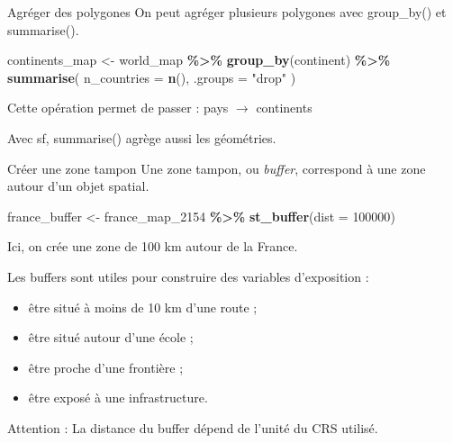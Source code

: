 \documentclass[
  10pt,
  ignorenonframetext,
]{beamer}
\newenvironment{Shaded}{\begin{snugshade}}{\end{snugshade}}
\newcommand{\AttributeTok}[1]{\textcolor[rgb]{0.13,0.29,0.53}{#1}}
\newcommand{\DecValTok}[1]{\textcolor[rgb]{0.00,0.00,0.81}{#1}}
\newcommand{\FunctionTok}[1]{\textcolor[rgb]{0.13,0.29,0.53}{\textbf{#1}}}
\newcommand{\NormalTok}[1]{#1}
\newcommand{\OtherTok}[1]{\textcolor[rgb]{0.56,0.35,0.01}{#1}}
\newcommand{\SpecialCharTok}[1]{\textcolor[rgb]{0.81,0.36,0.00}{\textbf{#1}}}
\newcommand{\StringTok}[1]{\textcolor[rgb]{0.31,0.60,0.02}{#1}}
\begin{document}
\begin{frame}[fragile]{Agréger des polygones}
\label{agruxe9ger-des-polygones}
On peut agréger plusieurs polygones avec group\_by() et summarise().

\begin{Shaded}
\begin{Highlighting}[]
\NormalTok{continents\_map }\OtherTok{\textless{}{-}}\NormalTok{ world\_map }\SpecialCharTok{\%\textgreater{}\%}
  \FunctionTok{group\_by}\NormalTok{(continent) }\SpecialCharTok{\%\textgreater{}\%}
  \FunctionTok{summarise}\NormalTok{(}
    \AttributeTok{n\_countries =} \FunctionTok{n}\NormalTok{(),}
    \AttributeTok{.groups =} \StringTok{"drop"}
\NormalTok{  )}
\end{Highlighting}
\end{Shaded}

Cette opération permet de passer : pays \(\rightarrow\) continents

Avec sf, summarise() agrège aussi les géométries.
\end{frame}

\begin{frame}[fragile]{Créer une zone tampon}
\label{cruxe9er-une-zone-tampon}
Une zone tampon, ou \textit{buffer}, correspond à une zone autour d'un
objet spatial.

\begin{Shaded}
\begin{Highlighting}[]
\NormalTok{france\_buffer }\OtherTok{\textless{}{-}}\NormalTok{ france\_map\_2154 }\SpecialCharTok{\%\textgreater{}\%}
  \FunctionTok{st\_buffer}\NormalTok{(}\AttributeTok{dist =} \DecValTok{100000}\NormalTok{)}
\end{Highlighting}
\end{Shaded}

Ici, on crée une zone de 100 km autour de la France.

Les buffers sont utiles pour construire des variables d'exposition :

\begin{itemize}
\item être situé à moins de 10 km d’une route ;
\item être situé autour d’une école ;
\item être proche d’une frontière ;
\item être exposé à une infrastructure.
\end{itemize}

Attention : La distance du buffer dépend de l'unité du CRS utilisé.
\end{frame}
\end{document}
